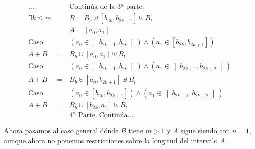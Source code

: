 \documentclass[final,12pt,a4paper,twoside,fleqn]{extbook}
\theoremstyle{definition}
\theoremstyle{remark}
\begin{document}
\begin{eqnarray}
\nonumber
\ldots&&\text{Continúa de la 3ª parte.}\\ \nonumber
\exists k \leq m &\quad&
B = B_b                     \uplus 
    \left[b_{2k},b_{2k+1}\right]       \uplus %
    B_l\\
&& A = \left[ a_0 , a_1 \right] \\
\text{Caso}\quad&\quad& \left( a_0 \in \left] b_{2k-1} , b_{2k} \right[
\right) \land \left( a_1 \in \left[ b_{2k} , b_{2k+1} \right] \right) \\
A + B & = & B_b \uplus \left[ a_0 , a_1 \right] \uplus B_l \\
\text{Caso}\quad&\quad& \left( a_0 \in \left] b_{2k-1} , b_{2k} \right[
\right) \land \left( a_1 \in \left] b_{2k+1} , b_{2k+2} \right[ \right) \\
A + B & = & B_b \uplus \left[ a_0 , b_{2k+1} \right] \uplus B_l\\
\text{Caso}\quad&\quad& \left( a_0 \in \left[ b_{2k} , b_{2k+1} \right]
\right) \land \left( a_1 \in \left] b_{2k+1} , b_{2k+2} \right[ \right) \\
A + B & = & B_b \uplus \left[ b_{2k} , a_1 \right] \uplus B_l\\ \nonumber
&&\text{4ª Parte.}\;\text{Continúa}\ldots
\end{eqnarray}



	Ahora pasamos al caso general dónde \(B\) tiene \(m > 1\) y \(A\) sigue
siendo con \(n = 1\), aunque ahora no ponemos restricciones sobre la longitud
del intervalo \(A\).
\end{document}
